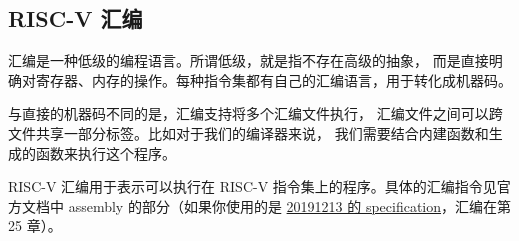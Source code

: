 \subsection{RISC-V 汇编}\label{RV-asm-intro}

汇编是一种低级的编程语言。所谓低级，就是指不存在高级的抽象，
而是直接明确对寄存器、内存的操作。每种指令集都有自己的汇编语言，用于转化成机器码。

与直接的机器码不同的是，汇编支持将多个汇编文件执行，
汇编文件之间可以跨文件共享一部分标签。比如对于我们的编译器来说，
我们需要结合内建函数和生成的函数来执行这个程序。

RISC-V 汇编用于表示可以执行在 RISC-V 指令集上的程序。具体的汇编指令见官方文档中
assembly 的部分（如果你使用的是
\href{https://riscv.org/wp-content/uploads/2019/12/riscv-spec-20191213.pdf}{20191213
的 specification}，汇编在第 25 章）。

